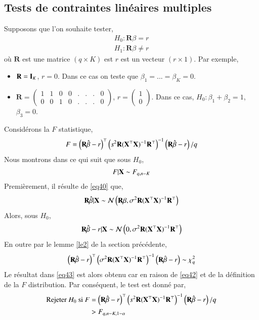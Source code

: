 \documentclass[10pt, reqno]{amsart}
\begin{document}
\subsection{Tests de contraintes linéaires multiples}
Supposons que l'on souhaite tester,
\begin{align*}
H_0: \mathbf{R}\beta = r\\
H_1: \mathbf{R}\beta \neq r
\end{align*}
où $\mathbf{R}$ est une matrice $(q \times K)$ est $r$ est un vecteur $(r\times 1)$. Par exemple, 
\begin{itemize}[label = - ]
\item $\mathbf{R} = \mathbf{I}_K$, $r=0$. Dans ce cas on teste que $\beta_1=...=\beta_K=0$.
\item $\mathbf{R} = \left(
\begin{array}{cccccccc}
1&1&0&0&.&.&.&0\\
0&0&1&0&.&.&.&0
\end{array}
\right)$, $r = \left(\begin{array}{c}
1\\
0
\end{array}
\right)
$. Dans ce cas, $H_0: \beta_1 + \beta_2 = 1$, $\beta_3=0$.
\end{itemize}
Considérons la $F$ statistique,
\begin{align*}
F = \left(\mathbf{R}\hat{\beta} - r\right)^\top\left(s^2\mathbf{R}(\mathbf X^\top\mathbf X)^{-1}\mathbf{R}^\top\right)^{-1}\left(\mathbf{R}\hat{\beta} - r\right)/q
\end{align*}
Nous montrons dans ce qui suit que sous $H_0$,
\begin{align}
F | \mathbf X \sim F_{q, n-K}
\label{eq43}
\end{align}
Premièrement, il résulte de \eqref{eq40} que,
\begin{align*}
\mathbf{R}\hat{\beta} | \mathbf X \sim\mathcal{N}\left(\mathbf{R}\beta, \sigma^2\mathbf{R}(\mathbf X^\top\mathbf X)^{-1}\mathbf{R}^\top\right)
\end{align*}
Alors, sous $H_0$,
\begin{align*}
\mathbf{R}\hat{\beta} - r | \mathbf X \sim\mathcal{N}\left(0, \sigma^2\mathbf{R}(\mathbf X^\top\mathbf X)^{-1}\mathbf{R}^\top\right)
\end{align*}
En outre par le lemme \eqref{le2} de la section précédente,
\begin{align*}
\left(\mathbf{R}\hat{\beta} - r\right)^\top\left(\sigma^2\mathbf{R}(\mathbf X^\top\mathbf X)^{-1}\mathbf{R}^\top\right)^{-1}\left(\mathbf{R}\hat{\beta} - r\right)\sim\chi^2_q
\end{align*}
Le résultat dans \eqref{eq43} est alors obtenu car en raison de \eqref{eq42} et de la définition de la $F$ distribution. Par conséquent, le test est donné par,
\begin{align*}
\textrm{Rejeter} \ H_0 \ \textrm{si} \ F &= \left(\mathbf{R}\hat{\beta} - r\right)^\top\left(s^2\mathbf{R}(\mathbf X^\top\mathbf X)^{-1}\mathbf{R}^\top\right)^{-1}\left(\mathbf{R}\hat{\beta} - r\right)/q\\
&> F_{q, n-K, 1-\alpha} 
\end{align*}
\end{document}
